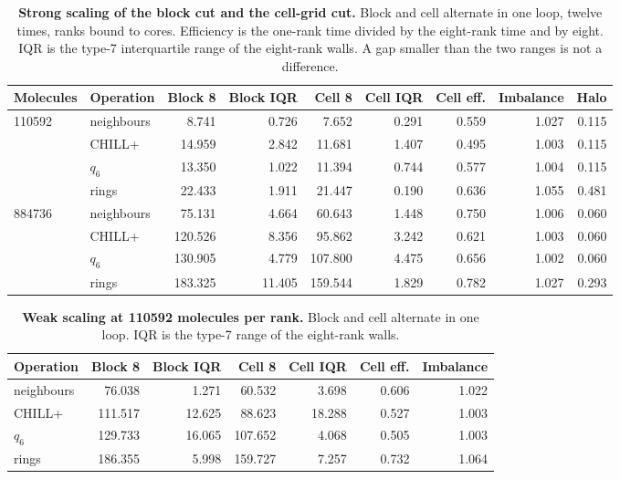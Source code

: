 \begin{table}[tbp]
\centering
\caption{\textbf{Strong scaling of the block cut and the cell-grid cut.}
Block and cell alternate in one loop, twelve times, ranks bound to cores.
Efficiency is the one-rank time divided by the eight-rank time and by eight.
IQR is the type-7 interquartile range of the eight-rank walls.
A gap smaller than the two ranges is not a difference.}
\label{tab:partition-strong}
\begin{tabular}{llrrrrrrr}
\toprule
Molecules & Operation & Block 8 & Block IQR & Cell 8 & Cell IQR & Cell eff. & Imbalance & Halo \\
\midrule
110592 & neighbours & 8.741 & 0.726 & 7.652 & 0.291 & 0.559 & 1.027 & 0.115 \\
 & CHILL+ & 14.959 & 2.842 & 11.681 & 1.407 & 0.495 & 1.003 & 0.115 \\
 & $q_6$ & 13.350 & 1.022 & 11.394 & 0.744 & 0.577 & 1.004 & 0.115 \\
 & rings & 22.433 & 1.911 & 21.447 & 0.190 & 0.636 & 1.055 & 0.481 \\
884736 & neighbours & 75.131 & 4.664 & 60.643 & 1.448 & 0.750 & 1.006 & 0.060 \\
 & CHILL+ & 120.526 & 8.356 & 95.862 & 3.242 & 0.621 & 1.003 & 0.060 \\
 & $q_6$ & 130.905 & 4.779 & 107.800 & 4.475 & 0.656 & 1.002 & 0.060 \\
 & rings & 183.325 & 11.405 & 159.544 & 1.829 & 0.782 & 1.027 & 0.293 \\
\bottomrule
\end{tabular}
\end{table}

\begin{table}[tbp]
\centering
\caption{\textbf{Weak scaling at 110592 molecules per rank.}
Block and cell alternate in one loop. IQR is the type-7 range of the eight-rank walls.}
\label{tab:partition-weak}
\begin{tabular}{lrrrrrr}
\toprule
Operation & Block 8 & Block IQR & Cell 8 & Cell IQR & Cell eff. & Imbalance \\
\midrule
neighbours & 76.038 & 1.271 & 60.532 & 3.698 & 0.606 & 1.022 \\
CHILL+ & 111.517 & 12.625 & 88.623 & 18.288 & 0.527 & 1.003 \\
$q_6$ & 129.733 & 16.065 & 107.652 & 4.068 & 0.505 & 1.003 \\
rings & 186.355 & 5.998 & 159.727 & 7.257 & 0.732 & 1.064 \\
\bottomrule
\end{tabular}
\end{table}
